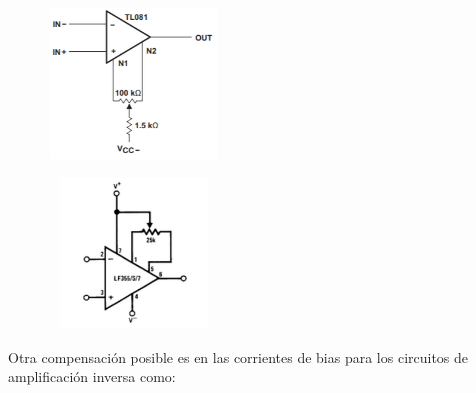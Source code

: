 \begin{itemize}
    \begin{minipage}{.4\textwidth}
    \begin{center}
        \includegraphics[width = 0.5\textwidth, height = 4cm]{../Ejercicio2-MediciondeBias/Informe/comptl081.png}
        \captionsetup{justification=centering}
        \label{ej2comp081} 
    \end{center}
    \end{minipage}
    \hspace{0.5cm}
    \begin{minipage}{.4\textwidth}
    \begin{center}
        \includegraphics[width = 0.5\textwidth, height = 4cm]{../Ejercicio2-MediciondeBias/Informe/complm365.png}
        \captionsetup{justification=centering}
        \label{ej2comp365} 
    \end{center}
    \end{minipage}
    
    Otra compensación posible es en las corrientes de bias para los circuitos de amplificación inversa como:
    

\end{itemize}
